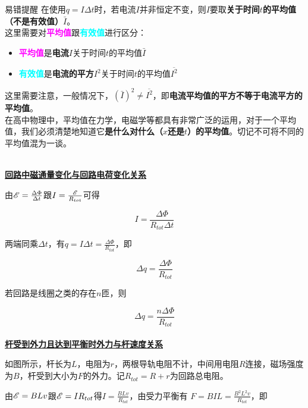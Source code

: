\begin{mk}{易错提醒}{}
在使用$q = I \Delta t$时，若电流$I$并非恒定不变，则$I$要取\textbf{关于时间$t$的平均值（不是有效值）}$\bar I$。
~\\

这里需要对\textcolor{magenta}{\textbf{平均值}}跟\textcolor{cyan}{\textbf{有效值}}进行区分：
\begin{itemize}
\item \textcolor{magenta}{\textbf{平均值}}是\textbf{电流}$I$关于时间$t$的平均值$\bar I$
\item \textcolor{cyan}{\textbf{有效值}}是\textbf{电流的平方}$I^2$关于时间$t$的平均值$\overline{I^2}$
\end{itemize}
这里需要注意，一般情况下，$({\bar I})^2 \neq \overline{I^2}$，即\textbf{电流平均值的平方不等于电流平方的平均值}。
~\\

在高中物理中，平均值在力学，电磁学等都具有非常广泛的运用，对于一个平均值，我们必须清楚地知道它\textbf{是什么对什么（$x$还是$t$）的平均值}。切记不可将不同的平均值混为一谈。
\end{mk}
~\\

\noindent \uline{\textbf{回路中磁通量变化与回路电荷变化关系}}

由$\mathscr{E} = \frac{\Delta \Phi}{\Delta t}$跟$I = \frac{\mathscr{E}}{R_{tot}}$可得

$$I = \frac{\Delta \Phi}{R_{tot} \Delta t}$$

两端同乘$\Delta t$，有$q = I \Delta t = \frac{\Delta \Phi}{R_{tot}}$，即

\begin{equation}
\boxed{\Delta q = \frac{\Delta \Phi}{R_{tot}}}
\end{equation}

若回路是线圈之类的存在$n$匝，则

\begin{equation}
\boxed{\Delta q = \frac{n \Delta \Phi}{R_{tot}}}
\end{equation}
~\\

\noindent \uline{\textbf{杆受到外力且达到平衡时外力与杆速度关系}}


如图所示，杆长为$L$，电阻为$r$，两根导轨电阻不计，中间用电阻$R$连接，磁场强度为$B$，杆受到大小为$F$的外力。记$R_{tot} = R + r$为回路总电阻。

由$\mathscr{E} = BLv$跟$\mathscr{E} = I R_{tot}$得$I = \frac{BLv}{R_{tot}}$，由受力平衡有
$F = BIL = \frac{B^2 L^2 v}{R_{tot}}$，即

